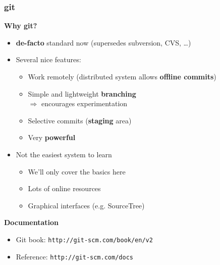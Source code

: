 \documentclass{beamer}
\begin{document}

\begin{frame}
  \frametitle{git}
  \textbf{\Large Why git?}
  \begin{itemize}
  \item \textbf{de-facto} standard now (supersedes subversion, CVS, \dots)
  \item Several nice features:
    \begin{itemize}
      \item Work remotely (distributed system allows \textbf{offline commits})
      \item Simple and lightweight \textbf{branching}\\$\Rightarrow$ encourages experimentation
      \item Selective commits (\textbf{staging} area)
      \item Very \textbf{powerful}
    \end{itemize}
  \item Not the easiest system to learn
    \begin{itemize}
      \item We'll only cover the basics here
      \item Lots of online resources
      \item Graphical interfaces (e.g. SourceTree)
    \end{itemize}
  \end{itemize}
  \vspace{2ex}
  \textbf{\Large Documentation}
  \begin{itemize}
  \item Git book: \texttt{http://git-scm.com/book/en/v2}
  \item Reference: \texttt{http://git-scm.com/docs}
  \end{itemize}
\end{frame}

\end{document}
